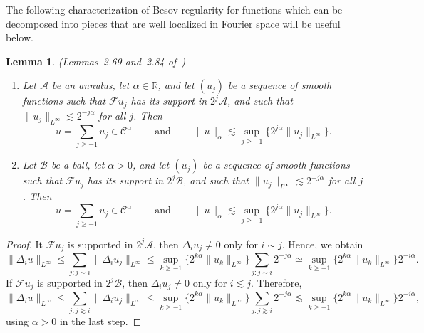 \documentclass[11pt,a4paper]{article}
\newcommand{\tmop}[1]{\ensuremath{\operatorname{#1}}}
\newenvironment{enumeratenumeric}{\begin{enumerate}[1.] }{\end{enumerate}}
\newtheorem{lemma}[theorem]{Lemma}
\theoremstyle{remark}
\newcommand{\CA}{\ensuremath{\mathscr{A}}}
\newcommand{\CB}{\ensuremath{\mathscr{B}}}
\newcommand{\CC}{\ensuremath{\mathscr{C}}}
\newcommand{\CF}{\ensuremath{\mathscr{F}}}
\begin{document}
The following characterization of Besov regularity for functions which can be decomposed into pieces that are well localized in Fourier space will be useful below.

\begin{lemma}\label{lem: Besov regularity of series}(Lemmas~2.69 and~2.84 of~{\cite{Bahouri2011}})
   \begin{enumeratenumeric}
      \item Let $\CA$ be an annulus, let $\alpha \in \mathbb{R}$, and let $(u_{j})$ be a sequence of smooth functions such that $\CF u_{j}$ has its support in $2^{j} \CA$, and such that $\| u_{j} \|_{L^{\infty}} \lesssim 2^{-j \alpha}$ for all $j$. Then
         \[
            u= \sum_{j \geqslant -1} u_{j} \in \CC^{\alpha} \qquad  \tmop{and} \qquad \| u \|_{\alpha} \lesssim \sup_{j \geqslant -1} \{ 2^{j \alpha} \| u_{j} \|_{L^{\infty}} \} .
         \]
      \item Let $\CB$ be a ball, let $\alpha >0$, and let $( u_{j} )$ be a sequence of smooth functions such that $\CF u_{j}$ has its support in $2^{j} \CB$, and such that $\| u_{j} \|_{L^{\infty}} \lesssim 2^{-j \alpha}$ for all $j$. Then
         \[
            u= \sum_{j \geqslant -1} u_{j} \in \CC^{\alpha} \qquad \tmop{and} \qquad \| u \|_{\alpha} \lesssim \sup_{j \geqslant -1} \{ 2^{j \alpha} \| u_{j} \|_{L^{\infty}} \} .
         \]
   \end{enumeratenumeric}
\end{lemma}

\begin{proof}
  It $\CF u_{j}$ is supported in $2^{j} \CA$, then $\Delta_{i} u_{j} \neq 0$ only for $i \sim j$. Hence, we obtain
  \[
     \| \Delta_{i} u \|_{L^{\infty}} \leqslant \sum_{j:j \sim i} \| \Delta_{i} u_{j} \|_{L^{\infty}} \leqslant \sup_{k \geqslant -1} \{ 2^{k \alpha} \| u_{k} \|_{L^{\infty}} \} \sum_{j:j \sim i} 2^{-j  \alpha} \simeq \sup_{k \geqslant -1} \{ 2^{k \alpha} \| u_{k} \|_{L^{\infty}} \} 2^{-i \alpha}.
  \]
  If $\CF u_{j}$ is supported in $2^{j} \CB$, then $\Delta_{i} u_{j} \neq 0$ only for $i \lesssim j$. Therefore,
   \[
      \| \Delta_{i} u \|_{L^{\infty}} \leqslant \sum_{j:j \gtrsim i} \| \Delta_{i} u_{j} \|_{L^{\infty}} \leqslant \sup_{k \geqslant -1} \{ 2^{k \alpha} \| u_{k} \|_{L^{\infty}} \} \sum_{j:j \gtrsim i} 2^{-j  \alpha}  \lesssim \sup_{k \geqslant -1} \{ 2^{k \alpha} \| u_{k} \|_{L^{\infty}} \} 2^{-i \alpha},
   \]
   using $\alpha >0$ in the last step.
\end{proof}
\end{document}

